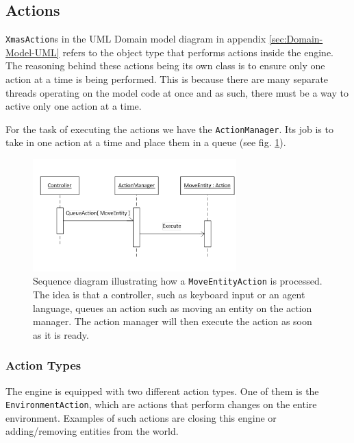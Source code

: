 
\subsection{Actions}

\texttt{XmasAction}s in the UML Domain model diagram in appendix \ref{sec:Domain-Model-UML}
refers to the object type that performs actions inside the engine.
The reasoning behind these actions being its own class is to ensure
only one action at a time is being performed. This is because there
are many separate threads operating on the model code at once and
as such, there must be a way to active only one action at a time.

For the task of executing the actions we have the \texttt{ActionManager}.
Its job is to take in one action at a time and place them in a queue
(see fig. \ref{fig:ActionQueuing}).

\begin{figure}
\begin{centering}
\includegraphics[width=0.7\textwidth]{ActionQueuing}
\par\end{centering}

\caption{\label{fig:ActionQueuing}Sequence diagram illustrating how a \texttt{MoveEntityAction}
is processed. The idea is that a controller, such as keyboard input
or an agent language, queues an action such as moving an entity on
the action manager. The action manager will then execute the action
as soon as it is ready.}
\end{figure}



\subsubsection{Action Types}

The engine is equipped with two different action types. One of them
is the \texttt{EnvironmentAction}, which are actions that perform
changes on the entire environment. Examples of such actions are closing
this engine or adding/removing entities from the world.

